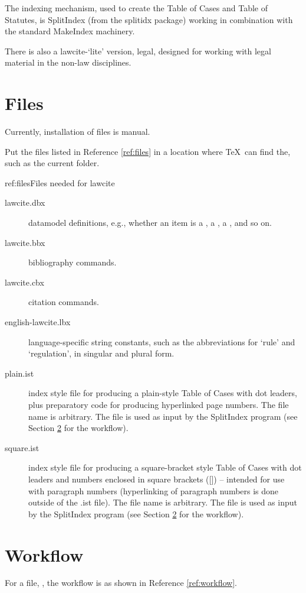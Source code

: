 \p The indexing mechanism, used to create the Table of Cases and Table of Statutes, is SplitIndex (from the splitidx package) working in combination with the standard MakeIndex machinery.

\p There is also a lawcite-`lite' version, legal, designed for working with legal material in the non-law disciplines.

\section{Files}
\p Currently, installation of files is manual.

\p Put the files listed in Reference \ref{ref:files} in a location where \TeX\ can find the, such as the current folder.

\begin{dor}{ref:files}{Files needed for lawcite}
\begin{description}
\item[lawcite.dbx]  datamodel definitions, e.g., whether an item is a , a , a , and so on.
\item[lawcite.bbx]  bibliography commands.
\item[lawcite.cbx]  citation commands.
\item[english-lawcite.lbx]  language-specific string constants, such as the abbreviations for `rule' and `regulation', in singular and plural form.
\item[plain.ist] index style file for producing a plain-style Table of Cases with dot leaders, plus preparatory code for producing hyperlinked page numbers. The file name is arbitrary. The file is used as input by the SplitIndex program (see Section \ref{workflow} for the workflow). 
\item[square.ist] index style file for producing a square-bracket style Table of Cases with dot leaders and numbers enclosed in square brackets ([]) -- intended for use with paragraph numbers (hyperlinking of paragraph numbers is done outside of the .ist file). The file name is arbitrary. The file is used as input by the SplitIndex program (see Section \ref{workflow} for the workflow).
\end{description}
\end{dor}

\section{Workflow}\label{workflow}
\p For a file, , the workflow is as shown in Reference \ref{ref:workflow}.

